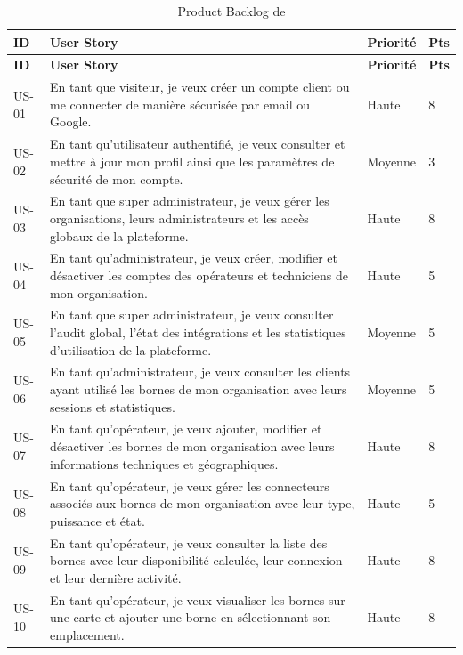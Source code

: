 \begingroup
\footnotesize
\setlength{\tabcolsep}{3.5pt}
\begin{longtable}{|C{1.25cm}|p{10.25cm}|C{1.65cm}|C{1.0cm}|}
  \caption{Product Backlog de \ProjectName{}}
  \label{tab:product-backlog}\\
  \hline
  \textbf{ID} & \textbf{User Story} & \textbf{Priorité} & \textbf{Pts}\\
  \hline
  \endfirsthead
  \hline
  \textbf{ID} & \textbf{User Story} & \textbf{Priorité} & \textbf{Pts}\\
  \hline
  \endhead
  US-01 & En tant que visiteur, je veux créer un compte client ou me connecter de
  manière sécurisée par email ou Google. & Haute & 8\\\hline
  US-02 & En tant qu'utilisateur authentifié, je veux consulter et mettre à jour mon
  profil ainsi que les paramètres de sécurité de mon compte. & Moyenne & 3\\\hline
  US-03 & En tant que super administrateur, je veux gérer les organisations, leurs
  administrateurs et les accès globaux de la plateforme. & Haute & 8\\\hline
  US-04 & En tant qu'administrateur, je veux créer, modifier et désactiver les comptes
  des opérateurs et techniciens de mon organisation. & Haute & 5\\\hline
  US-05 & En tant que super administrateur, je veux consulter l'audit global, l'état
  des intégrations et les statistiques d'utilisation de la plateforme. & Moyenne & 5\\\hline
  US-06 & En tant qu'administrateur, je veux consulter les clients ayant utilisé les
  bornes de mon organisation avec leurs sessions et statistiques. & Moyenne & 5\\\hline
  US-07 & En tant qu'opérateur, je veux ajouter, modifier et désactiver les bornes de
  mon organisation avec leurs informations techniques et géographiques. & Haute & 8\\\hline
  US-08 & En tant qu'opérateur, je veux gérer les connecteurs associés aux bornes de
  mon organisation avec leur type, puissance et état. & Haute & 5\\\hline
  US-09 & En tant qu'opérateur, je veux consulter la liste des bornes avec leur
  disponibilité calculée, leur connexion et leur dernière activité. & Haute & 8\\\hline
  US-10 & En tant qu'opérateur, je veux visualiser les bornes sur une carte et ajouter
  une borne en sélectionnant son emplacement. & Haute & 8\\\hline

\end{longtable}
